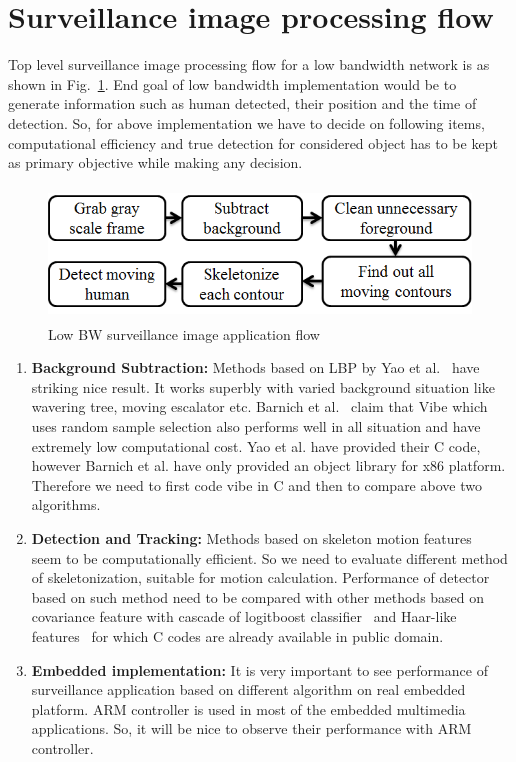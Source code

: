 \section{Surveillance image processing flow}
\indent Top level surveillance image processing flow for a low bandwidth
network is as shown in Fig.~\ref{image_pipeline}. End goal of low
bandwidth implementation would be to generate information such as human
detected, their position and the time of detection. So, for above
implementation we have to decide on following items, computational
efficiency and true detection for considered object has to be kept as
primary objective while making any decision.

\begin{figure}[!b]
\centering
\includegraphics[height=100pt]{Figures/image_pipeline}
\caption{Low BW surveillance image application flow}
\label{image_pipeline}
\end{figure}
\begin{enumerate}
\item \textbf{Background Subtraction:} Methods based on LBP by Yao et
	al.~\cite{11} have striking nice result. It works superbly with
	varied background situation like wavering tree, moving escalator
	etc. Barnich et al.~\cite{9} claim that Vibe which uses random
	sample selection also performs well in all situation and have
	extremely low computational cost. Yao et al. have provided their
	C code, however Barnich et al.  have only provided an object
	library for x86 platform. Therefore we need to first code vibe
	in C and then to compare above two algorithms.
\item \textbf{Detection and Tracking:} Methods based on skeleton motion
	features~\cite{32, 22, 31} seem to be computationally
	efficient. So we need to evaluate different method of
	skeletonization, suitable for motion calculation. Performance of
	detector based on such method need to be compared with other
	methods based on covariance feature with cascade of logitboost
	classifier~\cite{19}  and Haar-like features~\cite{17} for
	which C codes are already available in public domain.
\item \textbf{Embedded implementation:} It is very important to see
	performance of surveillance application based on different
	algorithm on real embedded platform. ARM controller is used in
	most of the embedded multimedia applications. So, it will be
	nice to observe their performance with ARM controller.
\end{enumerate}
